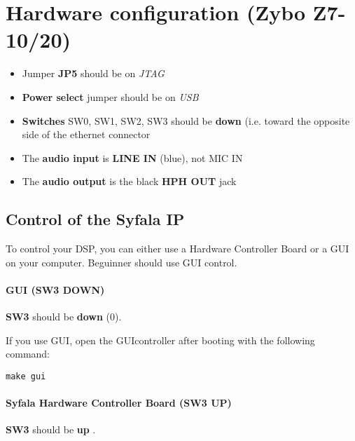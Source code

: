 \section{Hardware configuration (Zybo Z7-10/20)}
\label{hard}
\begin{itemize}

\item
  Jumper \textbf{JP5} should be on \emph{JTAG}
\item
  \textbf{Power select} jumper should be on \emph{USB}\\
\item
  \textbf{Switches} SW0, SW1, SW2, SW3 should be \textbf{down} (i.e. toward the opposite side of the ethernet connector\\
\item
  The \textbf{audio input} is \textbf{LINE IN} (blue), not MIC IN\\
\item
  The \textbf{audio output} is the black \textbf{HPH OUT} jack
\end{itemize}

\subsection{Control of the Syfala IP}
\label{control}

To control your DSP, you can either use a Hardware Controller Board or a
GUI on your computer. Beguinner should use GUI control.

\hypertarget{gui-sw3-down}{%
\paragraph{GUI (SW3 DOWN)}\label{gui-sw3-down}}

\textbf{SW3} should be \textbf{down} (0).

If you use GUI, open the GUIcontroller after booting with the following
command:

\begin{verbatim}
make gui
\end{verbatim}

\hypertarget{syfala-hardware-controller-board-sw3-up}{%
\paragraph{Syfala Hardware Controller Board (SW3
UP)}\label{syfala-hardware-controller-board-sw3-up}}

\textbf{SW3} should be \textbf{up} .

